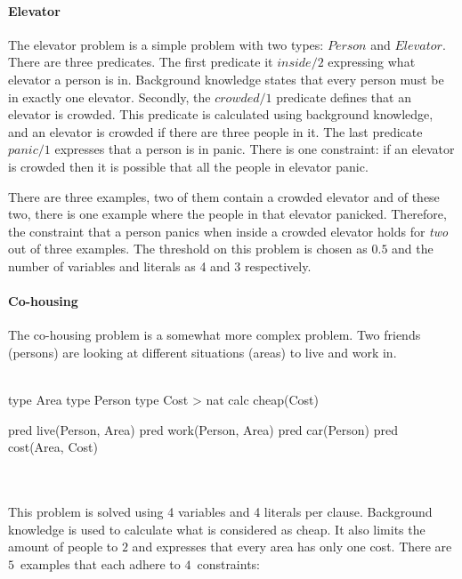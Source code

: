 \paragraph{Elevator}
The elevator problem is a simple problem with two types: $\mathit{Person}$ and $\mathit{Elevator}$.
There are three predicates.
The first predicate it $\mathit{inside}/2$ expressing what elevator a person is in.
Background knowledge states that every person must be in exactly one elevator.
Secondly, the $\mathit{crowded}/1$ predicate defines that an elevator is crowded.
This predicate is calculated using background knowledge, and an elevator is crowded if there are three people in it.
The last predicate $\mathit{panic}/1$ expresses that a person is in panic.
There is one constraint: if an elevator is crowded then it is possible that all the people in elevator panic.

There are three examples, two of them contain a crowded elevator and of these two, there is one example where the people in that elevator panicked.
Therefore, the constraint that a person panics when inside a crowded elevator holds for \emph{two} out of three examples.
The threshold on this problem is chosen as $0.5$ and the number of variables and literals as 4 and 3 respectively.

\paragraph{Co-housing}
The co-housing problem is a somewhat more complex problem.
Two friends (persons) are looking at different situations (areas) to live and work in.
\\\\
\begin{minipage}{0.5\textwidth}
	\begin{verbatim*}
		type Area
		type Person
		type Cost > nat
		calc cheap(Cost)
	\end{verbatim*}
\end{minipage}
\begin{minipage}{0.5\textwidth}
	\begin{verbatim*}
		pred live(Person, Area)
		pred work(Person, Area)
		pred car(Person)
		pred cost(Area, Cost)
	\end{verbatim*}
\end{minipage}
\\\\

This problem is solved using 4 variables and 4 literals per clause.
Background knowledge is used to calculate what is considered as cheap.
It also limits the amount of people to $2$ and expresses that every area has only one cost.
There are $5$~examples that each adhere to $4$~constraints:

